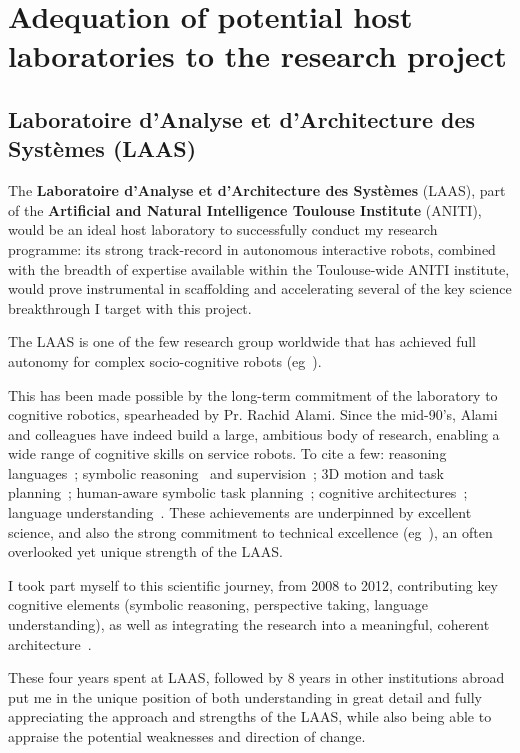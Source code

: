 \section{Adequation of potential host laboratories to the research project}

\subsection{Laboratoire d'Analyse et d'Architecture des Systèmes (LAAS)}

The \textbf{Laboratoire d'Analyse et d'Architecture des Systèmes} (LAAS), part
of the \textbf{Artificial and Natural Intelligence Toulouse Institute} (ANITI), would
be an ideal host laboratory to successfully conduct my research programme: its
strong track-record in autonomous interactive robots, combined with the breadth
of expertise available within the Toulouse-wide ANITI institute, would prove
instrumental in scaffolding and accelerating several of the key science
breakthrough I target with this project.


The LAAS is one of the few research group worldwide that has achieved full
autonomy for complex socio-cognitive robots (eg~\cite{lemaignan2017artificial}).

This has been made possible by the long-term commitment of the laboratory to
cognitive robotics, spearheaded by Pr. Rachid Alami. Since the mid-90's, Alami
and colleagues have indeed build a large, ambitious body of research, enabling a
wide range of cognitive skills on service robots. To cite a few: reasoning
languages~\autocite{Ingrand1996}; symbolic
reasoning~\autocite{lemaignan2010oro} and supervision~\autocite{Clodic2009}; 3D motion
and task planning~\autocite{Sisbot2008, Mainprice2011}; human-aware symbolic task
planning~\autocite{Alili2008,Lallement2014,milliez2016using}; cognitive
architectures~\autocite{lemaignan2017artificial,devin2016implemented}; language
understanding~\autocite{lemaignan2011grounding}.
These achievements are underpinned by excellent science, and also the strong
commitment to technical excellence (eg~\textcite{mallet2010genom3}), an often
overlooked yet unique strength of the LAAS.


I took part myself to this scientific journey, from 2008 to 2012, contributing
key cognitive elements (symbolic reasoning, perspective taking, language
understanding), as well as integrating the research into a meaningful, coherent
architecture~\autocite{lemaignan2017artificial}.

These four years spent at LAAS,
followed by 8 years in other institutions abroad put me in the unique position
of both understanding in great detail and fully appreciating the approach and
strengths of the LAAS, while also being able to appraise the potential
weaknesses and direction of change.

